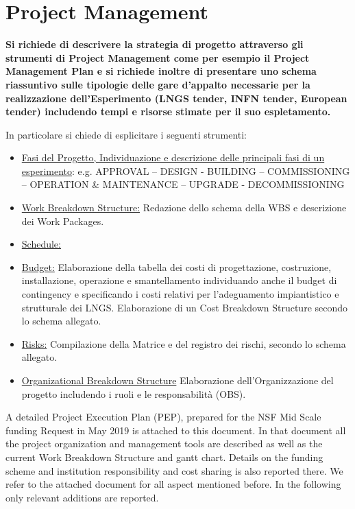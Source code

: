 \section{Project Management}
\label{sec:ProjectManagement}

{\bf\color{red}
Si richiede di descrivere la strategia di progetto attraverso gli strumenti di Project Management come per esempio il Project Management Plan e si richiede inoltre di presentare uno schema riassuntivo sulle tipologie delle gare d’appalto necessarie per la realizzazione dell’Esperimento (LNGS tender, INFN tender, European tender) includendo tempi e risorse stimate per il suo espletamento.

 In particolare si chiede di esplicitare i seguenti strumenti:
\begin{itemize}
    \item \underline{Fasi del Progetto, Individuazione e descrizione delle principali fasi di un esperimento}: e.g. APPROVAL – DESIGN - BUILDING – COMMISSIONING – OPERATION \& MAINTENANCE – UPGRADE - DECOMMISSIONING
    \item \underline{Work Breakdown Structure:} Redazione dello schema della WBS e descrizione dei Work Packages. 
    \item \underline{Schedule:}
    \item \underline{Budget:} Elaborazione della tabella dei costi di progettazione, costruzione, installazione, operazione e smantellamento individuando anche il budget di contingency e specificando i costi relativi per l’adeguamento impiantistico e strutturale dei LNGS. Elaborazione di un Cost Breakdown Structure secondo lo schema allegato.
    \item \underline{Risks:} Compilazione della Matrice e del registro dei rischi, secondo lo schema allegato.
    \item \underline{Organizational Breakdown Structure}
  Elaborazione dell’Organizzazione del progetto includendo i ruoli e le responsabilità (OBS).
    \end{itemize} 


}

\vspace{1cm}

A detailed Project Execution Plan (PEP), prepared for the NSF Mid Scale funding Request in May 2019 is attached to this document. In that document all the project organization and management tools are described as well as the current Work Breakdown Structure and gantt chart. Details on the funding scheme and institution responsibility and cost sharing is also reported there. We refer to the attached document for all aspect mentioned before. In the following only relevant additions  are reported.

